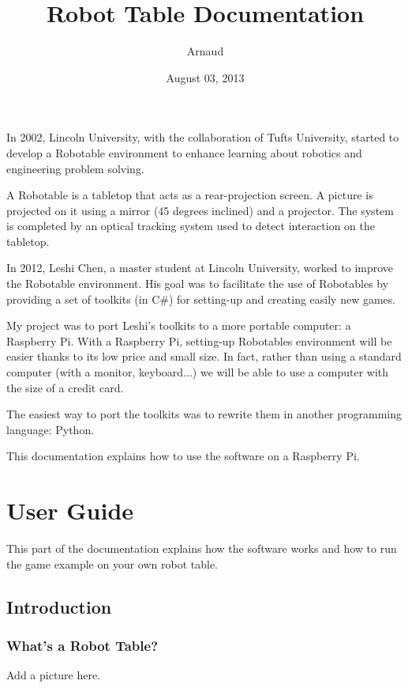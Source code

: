 \documentclass[letterpaper,10pt,english]{sphinxmanual}
\title{Robot Table Documentation}
\date{August 03, 2013}
\author{Arnaud}
\begin{document}
\maketitle
\tableofcontents
{}\label{index::doc}


In 2002, Lincoln University, with the collaboration of Tufts University, started to develop a Robotable environment to enhance learning about robotics and engineering problem solving.

A Robotable is a tabletop that acts as a rear-projection screen. A picture is projected on it using a mirror (45 degrees inclined) and a projector. The system is completed by an optical tracking system used to detect interaction on the tabletop.

In 2012, Leshi Chen, a master student at Lincoln University, worked to improve the Robotable environment. His goal was to facilitate the use of Robotables by providing a set of toolkits (in C\#) for setting-up and creating easily new games.

My project was to port Leshi's toolkits to a more portable computer: a Raspberry Pi. With a Raspberry Pi, setting-up Robotables environment will be easier thanks to its low price and small size. In fact, rather than using a standard computer (with a monitor, keyboard...) we will be able to use a computer with the size of a credit card.

The easiest way to port the toolkits was to rewrite them in another programming language: Python.

This documentation explains how to use the software on a Raspberry Pi.


\chapter{User Guide}
\label{index:user-guide}\label{index:welcome-to-robotable-s-documentation}
This part of the documentation explains how the software works
and how to run the game example on your own robot table.


\section{Introduction}
\label{user/intro:introduction}\label{user/intro::doc}

\subsection{What's a Robot Table?}
\label{user/intro:what-s-a-robot-table}
Add a picture here.
\end{document}
